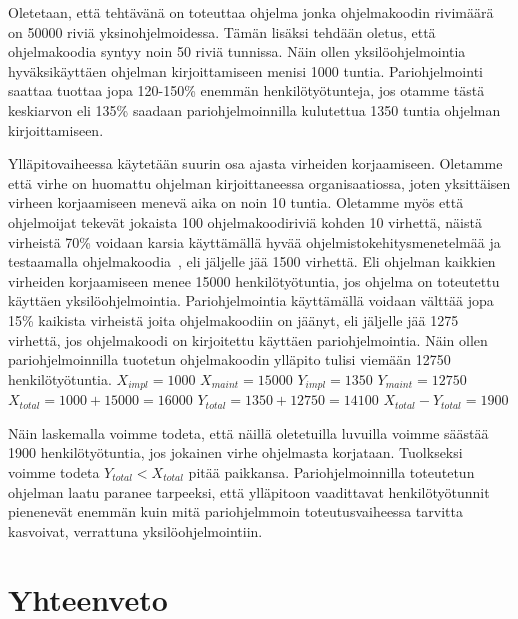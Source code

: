 \documentclass[finnish]{tktltiki2}
\theoremstyle{definition}
\theoremstyle{remark}
\begin{document}
Oletetaan, että tehtävänä on toteuttaa ohjelma jonka ohjelmakoodin rivimäärä on 50000 riviä yksinohjelmoidessa. Tämän lisäksi tehdään oletus, että ohjelmakoodia syntyy noin 50 riviä tunnissa. Näin ollen yksilöohjelmointia hyväksikäyttäen ohjelman kirjoittamiseen menisi 1000 tuntia. Pariohjelmointi saattaa tuottaa jopa 120-150\% enemmän henkilötyötunteja, jos otamme tästä keskiarvon eli 135\% saadaan pariohjelmoinnilla kulutettua 1350 tuntia ohjelman kirjoittamiseen.

Ylläpitovaiheessa käytetään suurin osa ajasta virheiden korjaamiseen. Oletamme että virhe on huomattu ohjelman kirjoittaneessa organisaatiossa, joten yksittäisen virheen korjaamiseen menevä aika on noin 10 tuntia. Oletamme myös että ohjelmoijat tekevät jokaista 100 ohjelmakoodiriviä kohden 10 virhettä, näistä virheistä 70\% voidaan karsia käyttämällä hyvää ohjelmistokehitysmenetelmää ja testaamalla ohjelmakoodia~\cite{costandbenefit2}, eli jäljelle jää 1500 virhettä. Eli ohjelman kaikkien virheiden korjaamiseen menee 15000 henkilötyötuntia, jos ohjelma on toteutettu käyttäen yksilöohjelmointia. Pariohjelmointia käyttämällä voidaan välttää jopa 15\% kaikista virheistä joita ohjelmakoodiin on jäänyt, eli jäljelle jää 1275 virhettä, jos ohjelmakoodi on kirjoitettu käyttäen pariohjelmointia. Näin ollen pariohjelmoinnilla tuotetun ohjelmakoodin ylläpito tulisi viemään 12750 henkilötyötuntia.\newline
$X_{impl} = 1000$\newline
$X_{maint} = 15000$\newline
$Y_{impl} = 1350$\newline
$Y_{maint} =12750$\newline
$X_{total} = 1000 + 15000 =16000 $\newline
$Y_{total} = 1350 + 12750 = 14100 $\newline
$X_{total}-Y_{total} = 1900$\newline

Näin laskemalla voimme todeta, että näillä oletetuilla luvuilla voimme säästää 1900 henkilötyötuntia, jos jokainen virhe ohjelmasta korjataan. Tuolkseksi voimme todeta $ Y_{total} < X_{total}$ pitää paikkansa. Pariohjelmoinnilla toteutetun ohjelman laatu paranee tarpeeksi, että ylläpitoon vaadittavat henkilötyötunnit pienenevät enemmän kuin mitä pariohjelmmoin toteutusvaiheessa tarvitta kasvoivat, verrattuna yksilöohjelmointiin.

\section{Yhteenveto}
\end{document}
